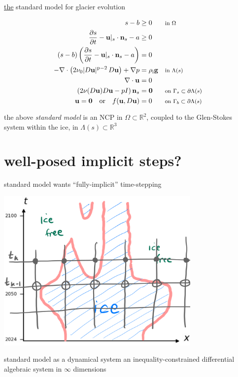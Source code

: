 \documentclass[10pt,dvipsnames]{beamer}
\theoremstyle{theorem}
\newcommand{\bg}{\mathbf{g}}
\newcommand{\bn}{\mathbf{n}}
\newcommand{\bu}{\mathbf{u}}
\newcommand{\bzero}{\bm{0}}
\newcommand{\RR}{\mathbb{R}}
\newcommand{\pp}{\mathrm{p}}
\newcommand{\rhoi}{\rho_{\text{i}}}
\newcommand{\where}[1]{\text{\footnotesize #1}}
\begin{document}
\begin{frame}{\underline{the} standard model for glacier evolution}

\begin{align*}
s - b &\ge 0 & &\where{in $\Omega$} \\
\frac{\partial s}{\partial t} - \bu|_s \cdot \bn_s - a &\ge 0 \\
(s - b) \left(\frac{\partial s}{\partial t} - \bu|_s \cdot \bn_s - a\right) &= 0 \\
- \nabla \cdot \left(2 \nu_0 |D\bu|^{\pp-2}\, D\bu\right) + \nabla p &= \rhoi \bg && \where{in $\Lambda(s)$} \\
\nabla \cdot \bu &= 0 \\
\left(2 \nu(D\bu) D\bu - pI\right) \bn_s &= \bzero && \where{on $\Gamma_s \subset \partial\Lambda(s)$} \\
\bu  = \bzero \quad \text{or} \quad f(\bu,D\bu) &= 0 && \where{on $\Gamma_b \subset \partial\Lambda(s)$}
\end{align*}

\bigskip
\begin{definition}
the above \emph{standard model} is an NCP in $\Omega \subset \RR^2$, coupled to the Glen-Stokes system within the ice, in $\Lambda(s) \subset \RR^3$
\end{definition}
\end{frame}




\section{well-posed implicit steps?}

\begin{frame}{standard model wants ``fully-implicit'' time-stepping}

\qquad\quad \includegraphics[width=0.75\textwidth]{implicitstep}

\bigskip
\begin{block}{standard model as a dynamical system}
an inequality-constrained differential algebraic system in $\infty$ dimensions
\end{block}
\end{frame}
\end{document}
